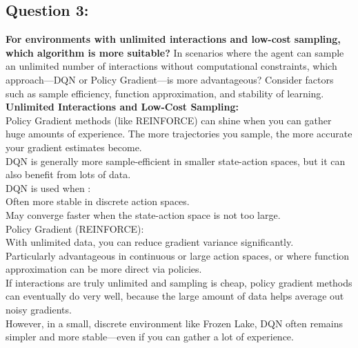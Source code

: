 \documentclass[12pt]{article}
\begin{document}
{{{				\subsection{Question 3:}
				\textbf{For environments with unlimited interactions and low-cost sampling, which algorithm is more suitable?}
				\newline
				In scenarios where the agent can sample an unlimited number of interactions without computational constraints, which approach—DQN or Policy Gradient—is more advantageous? Consider factors such as sample efficiency, function approximation, and stability of learning.\\
				\textbf{Unlimited Interactions and Low-Cost Sampling:}\\
				Policy Gradient methods (like REINFORCE) can shine when you can gather huge amounts of experience. The more trajectories you sample, the more accurate your gradient estimates become.\\
				DQN is generally more sample-efficient in smaller state-action spaces, but it can also benefit from lots of data.\\
				DQN is used when :\\
				Often more stable in discrete action spaces.\\
				May converge faster when the state-action space is not too large.\\
				Policy Gradient (REINFORCE):\\
				With unlimited data, you can reduce gradient variance significantly.\\
				Particularly advantageous in continuous or large action spaces, or where function approximation can be more direct via policies.\\
				If interactions are truly unlimited and sampling is cheap, policy gradient methods can eventually do very well, because the large amount of data helps average out noisy gradients.\\
				However, in a small, discrete environment like Frozen Lake, DQN often remains simpler and more stable—even if you can gather a lot of experience.
		}}
		
		
		
		\newpage
		
		{}}
\end{document}
